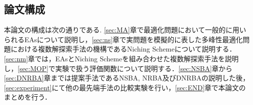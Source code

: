 \documentclass[a4j,11pt]{jarticle}
\def\proposed{DNRBA}
\def\proposedJ{適応的個体間距離に基づく複数解探索型Bat Algorithm}
\begin{document}



\subsection{論文構成}
本論文の構成は次の通りである.
\ref{sec:MA}章で最適化問題において一般的に用いられるEAsについて説明し，\ref{sec:ns}章で実問題を模擬的に表した多峰性最適化問題における複数解探索手法の機構であるNiching Schemeについて説明する．\ref{sec:nm}章では，EAsとNiching Schemeを組み合わせた複数解探索手法を説明し，\ref{sec:MOP}で実験で扱う評価関数について説明する．\ref{sec:NSBA}章から\ref{sec:DNRBA}章までは提案手法であるNSBA, NRBA及びDNRBAの説明した後，\ref{sec:experiment}にて他の最先端手法の比較実験を行い，\ref{sec:END}章で本論文のまとめを行う．
\end{document}
